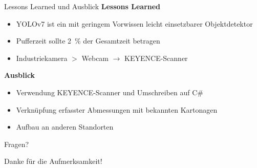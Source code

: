 \documentclass[10pt,ngerman]{beamer}
\begin{document}
\begin{frame}[fragile]{Lessons Learned und Ausblick}
  \textbf{Lessons Learned}
  \begin{itemize}
    \item YOLOv7 ist ein mit geringem Vorwissen leicht einsetzbarer Objektdetektor
          \pause
    \item Pufferzeit sollte \SI{2}{\percent} der Gesamtzeit betragen
          \pause
    \item Industriekamera $>$ Webcam $\rightarrow$ KEYENCE-Scanner
  \end{itemize}

  \pause

  \textbf{Ausblick}
  \begin{itemize}
    \item Verwendung KEYENCE-Scanner und Umschreiben auf C\#
          \pause
    \item Verknüpfung erfasster Abmessungen mit bekannten Kartonagen
          \pause
    \item Aufbau an anderen Standorten
  \end{itemize}
\end{frame}


\begin{frame}[standout]
  Fragen?
\end{frame}



\appendix


\begin{frame}[standout]
  Danke für die Aufmerksamkeit!
\end{frame}
\end{document}

